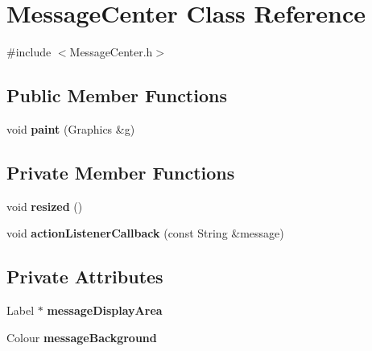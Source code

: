 \hypertarget{classMessageCenter}{\section{Message\-Center Class Reference}
\label{classMessageCenter}
}


{\ttfamily \#include $<$Message\-Center.\-h$>$}

\subsection*{Public Member Functions}
\begin{DoxyCompactItemize}
\item 
\hypertarget{classMessageCenter_afca5ea751cb84ee12f59115c8221e4fa}{void {\bfseries paint} (Graphics \&g)}\label{classMessageCenter_afca5ea751cb84ee12f59115c8221e4fa}

\end{DoxyCompactItemize}
\subsection*{Private Member Functions}
\begin{DoxyCompactItemize}
\item 
\hypertarget{classMessageCenter_a28c4ab0e94a5d3bc0393d5ecb753ef30}{void {\bfseries resized} ()}\label{classMessageCenter_a28c4ab0e94a5d3bc0393d5ecb753ef30}

\item 
\hypertarget{classMessageCenter_acd9b8596f683f0a6a6e679a1d56ce7da}{void {\bfseries action\-Listener\-Callback} (const String \&message)}\label{classMessageCenter_acd9b8596f683f0a6a6e679a1d56ce7da}

\end{DoxyCompactItemize}
\subsection*{Private Attributes}
\begin{DoxyCompactItemize}
\item 
\hypertarget{classMessageCenter_a3794f59dfc8644c4a8105b027637b70a}{Label $\ast$ {\bfseries message\-Display\-Area}}\label{classMessageCenter_a3794f59dfc8644c4a8105b027637b70a}

\item 
\hypertarget{classMessageCenter_ae70aa66a29d6d56270d5e5063aa7acf0}{Colour {\bfseries message\-Background}}\label{classMessageCenter_ae70aa66a29d6d56270d5e5063aa7acf0}

\end{DoxyCompactItemize}


